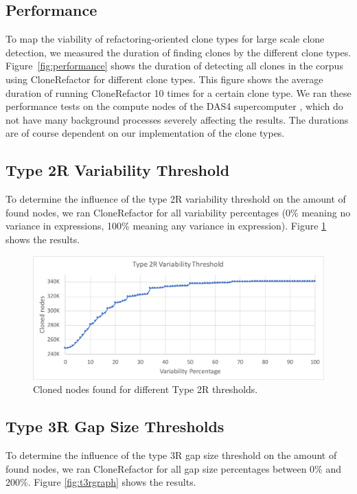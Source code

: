\subsection{Performance}
To map the viability of refactoring-oriented clone types for large scale clone detection, we measured the duration of finding clones by the different clone types. Figure~\ref{fig:performance} shows the duration of detecting all clones in the corpus using CloneRefactor for different clone types. This figure shows the average duration of running CloneRefactor 10 times for a certain clone type. We ran these performance tests on the compute nodes of the DAS4 supercomputer \cite{bal2016medium}, which do not have many background processes severely affecting the results. The durations are of course dependent on our implementation of the clone types.

\subsection{Type 2R Variability Threshold}
To determine the influence of the type 2R variability threshold on the amount of found nodes, we ran CloneRefactor for all variability percentages (0\% meaning no variance in expressions, 100\% meaning any variance in expression). Figure \ref{fig:t2rgraph} shows the results.

\begin{figure}[H]
  \includegraphics[width=1\textwidth]{img/T2R}
  \caption{Cloned nodes found for different Type 2R thresholds.}
  \label{fig:t2rgraph}
\end{figure}

\subsection{Type 3R Gap Size Thresholds}
To determine the influence of the type 3R gap size threshold on the amount of found nodes, we ran CloneRefactor for all gap size percentages between 0\% and 200\%. Figure \ref{fig:t3rgraph} shows the results.

